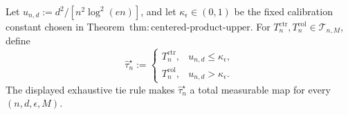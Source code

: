 Let \(u_{n,d}:=d^2/[n^2\log^2(en)]\), and let \(\kappa_{\epsilon}\in(0,1)\) be the fixed calibration constant chosen in Theorem~\(\mathrm{thm:centered\text{-}product\text{-}upper}\).  For \(T_n^{\mathrm{ctr}},T_n^{\mathrm{col}}\in\mathcal T_{n,M}\), define
\[
 \widehat\tau_n^{\star}:=
 \begin{cases}
 T_n^{\mathrm{ctr}},&u_{n,d}\le\kappa_{\epsilon},\\
 T_n^{\mathrm{col}},&u_{n,d}>\kappa_{\epsilon}.
 \end{cases}
\]
The displayed exhaustive tie rule makes \(\widehat\tau_n^{\star}\) a total measurable map for every \((n,d,\epsilon,M)\).